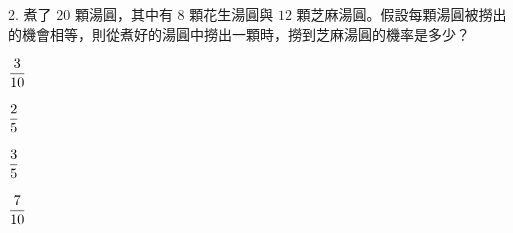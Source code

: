 \documentclass[12pt]{article}
\begin{document}
\begin{problem}
  \item[2.] 煮了 $20$ 顆湯圓，其中有 $8$ 顆花生湯圓與 $12$ 顆芝麻湯圓。假設每顆湯圓被撈出的機會相等，則從煮好的湯圓中撈出一顆時，撈到芝麻湯圓的機率是多少？
  \begin{choices}
    \item $\fraction{3}{10}$
    \item $\fraction{2}{5}$
    \item $\fraction{3}{5}$
    \item $\fraction{7}{10}$
  \end{choices}
\end{problem}
\end{document}
